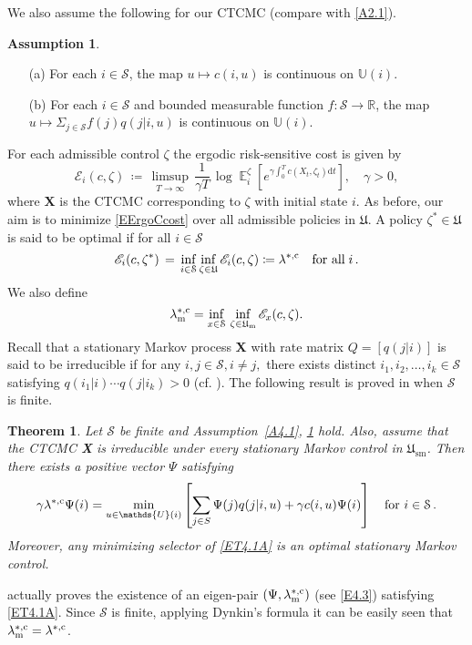\documentclass[notitlepage,11pt,reqno]{amsart}
\numberwithin{equation}{section}
\theoremstyle{plain}
\newtheorem{theorem}{Theorem}[section]
\theoremstyle{definition}
\newtheorem{assumption}{Assumption}[section]
\theoremstyle{remark}
\newcommand{\Act}{{\mathds{U}}}
\newcommand{\sE}{{\mathscr{E}}}     %
\newcommand{\cS}{{\mathcal{S}}}     %
\newcommand{\Uadm}{\mathfrak{U}}
\newcommand{\Um}{\mathfrak{U}_{\mathrm{m}}}
\newcommand{\Usm}{\mathfrak{U}_{\mathrm{sm}}}
\newcommand{\lamstrcm}{\lambda^{*,{\rm c}}}
\newcommand{\RR}{\mathds{R}} %
\DeclareMathOperator{\Exp}{\mathbb{E}} %
\newcommand{\D}{\mathrm{d}} %
\newcommand{\df}{\coloneqq}
\begin{document}
We also assume the following for our CTCMC (compare with \cref{A2.1}).
\begin{assumption}\label{A4.3}
\begin{itemize}
\item[(a)] For each $i\in \cS$, the map $u\mapsto c(i,u)$ is continuous on $\Act(i)$.
\item[(b)] For each $i\in \cS$ and bounded measurable function $f:\cS\to\RR$, the map $u\mapsto \Sigma_{j\in \cS}f(j)q(j|i,u)$ is continuous on $\Act(i)$.
\end{itemize}
\end{assumption}

For each  admissible control $\zeta$ the ergodic risk-sensitive cost is given by
\begin{equation}\label{EErgoCcost}
\sE_i(c, \zeta) \,\df\, \limsup_{ T\to\infty} \, \frac{1}{\gamma T}\,
\log \Exp_i^{\zeta} \left[e^{\gamma \int_{0}^{T} c(X_t, \zeta_t)\D t}\right],\quad \gamma>0,
\end{equation} 
where $\textbf{X}$ is the CTCMC corresponding to $\zeta$ with initial state $i$.
As before, our aim is to minimize \cref{EErgoCcost} over all admissible policies in $\Uadm$. A policy $\zeta^{*}\in \Uadm$ is said to be optimal if for all $i\in \cS$ 
$$
\sE_i(c,\zeta^{*}) \, = \, \inf_{i\in \cS}\inf_{\zeta\in \Uadm}\sE_i(c, \zeta)\df\lamstrcm \quad \text{for all}\; i\,.
$$
We also define
\begin{equation}\label{E4.3}
\lambda^{*,{\rm c}}_{\rm m}=\inf_{x\in\cS}\, \inf_{\zeta\in\Um}\sE_x(c, \zeta).
\end{equation}
Recall that a stationary Markov process {\bf X} with rate matrix $Q=[q(j|i)]$ is said to be irreducible if for any $i, j \in \cS, i\neq j,$
there exists distinct $i_1, i_2, \ldots, i_k\in \cS$ satisfying $q(i_1|i)\cdots q(j|i_k)>0$ (cf.
\cite[p.~107]{GHL09}). The following result is proved in \cite[Theorem~3.2]{MR3520987} when $\cS$ is finite.
\begin{theorem}\label{T4.1}
Let $\cS$ be finite and Assumption~\ref{A4.1}, \ref{A4.3} hold. Also, assume that the CTCMC \textbf{X} is irreducible under every stationary Markov control in
$\Usm$. Then there exists a positive vector $\Psi$ satisfying
\begin{equation}\label{ET4.1A}
\gamma\lamstrcm \Psi(i) = \min_{u\in\Act(i)}\left[\sum_{j\in S} \Psi(j)q(j|i,u) + \gamma c(i, u)\Psi(i)\right]\quad\text{for}\,\, i\in \cS\,.
\end{equation}
Moreover, any minimizing selector of \eqref{ET4.1A} is an optimal stationary Markov control.
\end{theorem}
\cite[Theorem~3.2]{MR3520987} actually proves the existence of an eigen-pair $(\Psi, \lambda^{*,{\rm c}}_{\rm m})$ (see \eqref{E4.3}) satisfying \eqref{ET4.1A}. Since 
$\cS$ is finite, applying Dynkin's formula it can be easily seen that $\lambda^{*,{\rm c}}_{\rm m}=\lamstrcm$.
\end{document}
